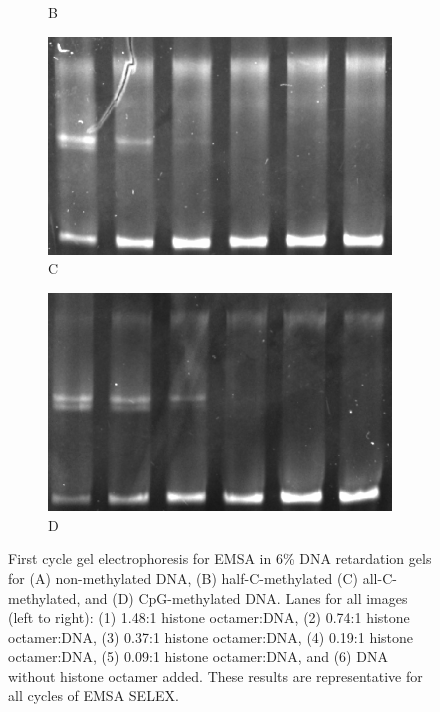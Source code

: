 \documentclass[parskip=full, numbers=noenddot]{scrreprt}
\begin{document}
\begin{figure}[htpb]
\begin{subfigure}[htpb]{0.4\textwidth}
    \caption{B}
    \label{fig:reconstnuc_b}
  \end{subfigure}
  \begin{subfigure}[htpb]{0.4\textwidth}
    \centering
    \includegraphics[width=\textwidth]{reconstnuc_c}
    \caption{C}
    \label{fig:reconstnuc_c}
  \end{subfigure}
  \begin{subfigure}[htpb]{0.4\textwidth}
    \centering
    \includegraphics[width=\textwidth]{reconstnuc_d}
    \caption{D}
    \label{fig:reconstnuc_d}
  \end{subfigure}
  \caption{First cycle gel electrophoresis for EMSA in 6\% DNA retardation gels for (A) non-methylated DNA, (B) half-C-methylated (C) all-C-methylated, and (D) CpG-methylated DNA. Lanes for all images (left to right): (1) 1.48:1 histone octamer:DNA, (2) 0.74:1 histone octamer:DNA, (3) 0.37:1 histone octamer:DNA, (4) 0.19:1 histone octamer:DNA, (5) 0.09:1 histone octamer:DNA, and (6) DNA without histone octamer added. These results are representative for all cycles of EMSA SELEX.}
  \label{fig:reconstnuc}
\end{figure}
\end{document}

